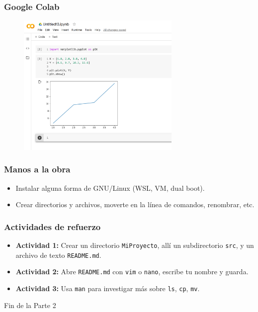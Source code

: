 \documentclass[10pt]{beamer}
\begin{document}
\begin{frame}[fragile]
\frametitle{Google Colab}
\begin{figure}
\includegraphics[width=0.7\textwidth]{GColab04.png}
\end{figure}
\end{frame}

\begin{frame}
\frametitle{Manos a la obra}
\begin{itemize}\small
    \item Instalar alguna forma de GNU/Linux (WSL, VM, dual boot).
    \item Crear directorios y archivos, moverte en la línea de comandos, renombrar, etc.
\end{itemize}
\end{frame}

\begin{frame}
\frametitle{Actividades de refuerzo}
\begin{itemize}\small
    \item \textbf{Actividad 1:} Crear un directorio \texttt{MiProyecto}, allí un subdirectorio \texttt{src}, y un archivo de texto \texttt{README.md}.
    \item \textbf{Actividad 2:} Abre \texttt{README.md} con \texttt{vim} o \texttt{nano}, escribe tu nombre y guarda.
    \item \textbf{Actividad 3:} Usa \texttt{man} para investigar más sobre \texttt{ls}, \texttt{cp}, \texttt{mv}.
\end{itemize}
\end{frame}

\begin{frame}
\Huge{\centerline{Fin de la Parte 2}}
\end{frame}
\end{document}
